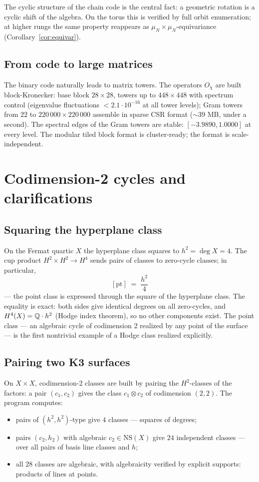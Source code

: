 The cyclic structure of the chain code is the central fact: a
geometric rotation is a cyclic shift of the algebra. On the torus
this is verified by full orbit enumeration; at higher rungs the same
property reappears as $\mu_N\times\mu_N$-equivariance
(Corollary~\ref{cor:equivar}).

\subsection{From code to large matrices}

The binary code naturally leads to matrix towers. The operators
$O_\chi$ are built block-Kronecker: base block $28\times28$, towers
up to $448\times448$ with spectrum control (eigenvalue fluctuations
$<2.1\cdot10^{-16}$ at all tower levels); Gram towers from $22$ to
$220\,000\times220\,000$ assemble in sparse CSR format
($\sim$39 MB, under a second). The spectral edges of the Gram towers
are stable: $[-3.9890, 1.0000]$ at every level. The modular tiled
block format is cluster-ready; the format is scale-independent.

\section{Codimension-2 cycles and clarifications}\label{sec:codim2}

\subsection{Squaring the hyperplane class}

On the Fermat quartic $X$ the hyperplane class squares to
$h^2=\deg X=4$. The cup product $H^2\times H^2\to H^4$ sends pairs of
classes to zero-cycle classes; in particular,
\[
  [\mathrm{pt}] \;=\; \frac{h^2}{4}
\]
--- the point class is expressed through the square of the
hyperplane class. The equality is exact: both sides give identical
degrees on all zero-cycles, and $H^4(X)=\mathbb{Q}\cdot h^2$ (Hodge index
theorem), so no other components exist. The point class --- an
algebraic cycle of codimension 2 realized by any point of the
surface --- is the first nontrivial example of a Hodge class
realized explicitly.

\subsection{Pairing two K3 surfaces}

On $X\times X$, codimension-2 classes are built by pairing the
$H^2$-classes of the factors: a pair $(c_1,c_2)$ gives the class
$c_1\otimes c_2$ of codimension $(2,2)$. The program computes:
\begin{itemize}[leftmargin=1.6em, itemsep=0.1em]
\item pairs of $(h^2,h^2)$-type give $4$ classes --- squares of
  degrees;
\item pairs $(c_2,h_2)$ with algebraic $c_2\in\mathrm{NS}(X)$ give
  $24$ independent classes --- over all pairs of basis line classes
  and $h$;
\item all $28$ classes are algebraic, with algebraicity verified by
  explicit supports: products of lines at points.
\end{itemize}

